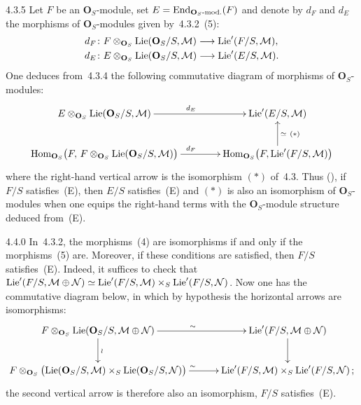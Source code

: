 \begin{remark}{4.3.5}\label{II.4.3.5}
{\renewcommand{\thefootnote}{(67)}}
Let \(F\) be an \(\mathbf{O}_{S}\)-module, set
\(E=\operatorname{End}_{\mathbf{O}_{S}\text{-mod.}}(F)\) and denote by \(d_{F}\) and
\(d_{E}\) the morphisms of \(\mathbf{O}_{S}\)-modules given by~4.3.2~(5):
\begin{align*}
d_{F}&\colon F\otimes_{\mathbf{O}_{S}}\operatorname{Lie}(\mathbf{O}_{S}/S,\mathcal{M})
\longrightarrow\operatorname{Lie}'(F/S,\mathcal{M}),\\
d_{E}&\colon E\otimes_{\mathbf{O}_{S}}\operatorname{Lie}(\mathbf{O}_{S}/S,\mathcal{M})
\longrightarrow\operatorname{Lie}'(E/S,\mathcal{M}).
\end{align*}
One deduces from~4.3.4 the following commutative diagram of morphisms of
\(\mathbf{O}_{S}\)-modules:
\[
\xymatrix@C=4em{
E\otimes_{\mathbf{O}_{S}}\Lie(\mathbf{O}_{S}/S,\mathcal{M})
  \ar[r]^{d_{E}}
&
\Lie'(E/S,\mathcal{M})
\\
\Hom_{\mathbf{O}_{S}}\bigl(F,\,
  F\otimes_{\mathbf{O}_{S}}\Lie(\mathbf{O}_{S}/S,\mathcal{M})\bigr)
  \ar[r]^{d_{F}}
&
\Hom_{\mathbf{O}_{S}}\bigl(F,\Lie'(F/S,\mathcal{M})\bigr)
  \ar[u]_{\simeq\ (*)}
}
\]
where the right-hand vertical arrow is the isomorphism \((*)\) of~4.3.
Thus (\loccit), if \(F/S\) satisfies~(E), then \(E/S\) satisfies~(E) and
\((*)\) is also an isomorphism of \(\mathbf{O}_{S}\)-modules when one equips
the right-hand terms with the \(\mathbf{O}_{S}\)-module structure deduced
from~(E).
\end{remark}

\begin{remark}{4.4.0}\label{II.4.4.0}
{\renewcommand{\thefootnote}{(68)}}
In~4.3.2, the morphisms~(4) are isomorphisms if and only if the
morphisms~(5) are. Moreover, if these conditions are satisfied, then \(F/S\)
satisfies~(E). Indeed, it suffices to check that
\(\operatorname{Lie}'(F/S,\mathcal{M}\oplus\mathcal{N})
\simeq
\operatorname{Lie}'(F/S,\mathcal{M})\times_{S}\operatorname{Lie}'(F/S,\mathcal{N})\).
Now one has the commutative diagram below, in which by hypothesis the
horizontal arrows are isomorphisms:
\[
\xymatrix@C=3em{
F\otimes_{\mathbf{O}_{S}}\Lie(\mathbf{O}_{S}/S,\mathcal{M}\oplus\mathcal{N})
  \ar[r]^{\sim}
  \ar[d]^{\wr}
&
\Lie'(F/S,\mathcal{M}\oplus\mathcal{N})
  \ar[d]
\\
F\otimes_{\mathbf{O}_{S}}
  \bigl(\Lie(\mathbf{O}_{S}/S,\mathcal{M})
    \times_{S}\Lie(\mathbf{O}_{S}/S,\mathcal{N})\bigr)
  \ar[r]^{\sim}
&
\Lie'(F/S,\mathcal{M})\times_{S}\Lie'(F/S,\mathcal{N})\,;
}
\]
the second vertical arrow is therefore also an isomorphism, \ie \(F/S\)
satisfies~(E).
\end{remark}

